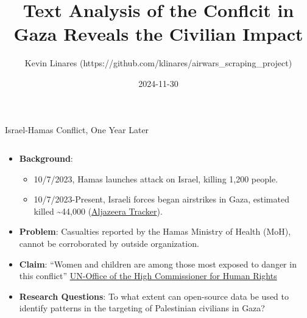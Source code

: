 \documentclass[
  ignorenonframetext,
]{beamer}
\title{Text Analysis of the Conflcit in Gaza Reveals the Civilian
Impact}
\author{Kevin Linares
(https://github.com/klinares/airwars\_scraping\_project)}
\date{2024-11-30}
\begin{document}
\frame{\titlepage}


\begin{frame}{Israel-Hamas Conflict, One Year Later}
\label{israel-hamas-conflict-one-year-later}
\begin{columns}[T]
\begin{column}{0.5\textwidth}
\begin{itemize}
\item
  \textbf{Background}:

  \begin{itemize}
  \item
    10/7/2023, Hamas launches attack on Israel, killing 1,200 people.
  \item
    10/7/2023-Present, Israeli forces began airstrikes in Gaza,
    estimated killed \textasciitilde44,000
    (\href{https://www.aljazeera.com/news/longform/2023/10/9/israel-hamas-war-in-maps-and-charts-live-tracker}{Aljazeera
    Tracker}).
  \end{itemize}
\item
  \textbf{Problem}: Casualties reported by the Hamas Ministry of Health
  (MoH), cannot be corroborated by outside organization.
\item
  \textbf{Claim}: ``Women and children are among those most exposed to
  danger in this conflict''
  \href{https://www.ohchr.org/en/press-releases/2024/05/onslaught-violence-against-women-and-children-gaza-unacceptable-un-experts}{UN-Office
  of the High Commissioner for Human Rights}
\item
  \textbf{Research Questions}: To what extent can open-source data be
  used to identify patterns in the targeting of Palestinian civilians in
  Gaza?
\end{itemize}
\end{column}


\end{columns}
\end{frame}
\end{document}
